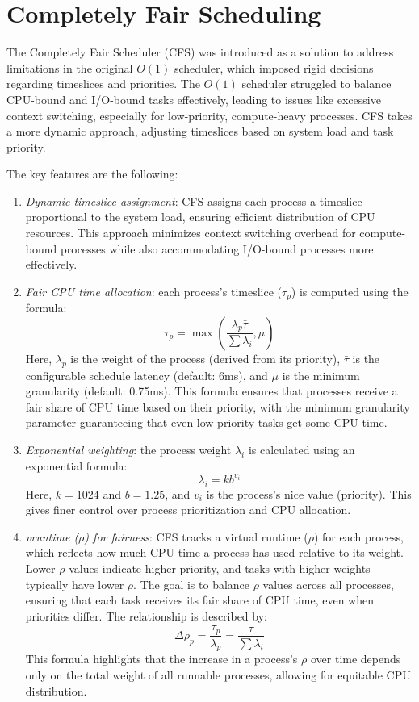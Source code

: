 \section{Completely Fair Scheduling}

The Completely Fair Scheduler (CFS) was introduced as a solution to address limitations in the original $O(1)$ scheduler, which imposed rigid decisions regarding timeslices and priorities. 
The $O(1)$ scheduler struggled to balance CPU-bound and I/O-bound tasks effectively, leading to issues like excessive context switching, especially for low-priority, compute-heavy processes.
CFS takes a more dynamic approach, adjusting timeslices based on system load and task priority.

The key features are the following: 
\begin{enumerate}
    \item \textit{Dynamic timeslice assignment}: CFS assigns each process a timeslice proportional to the system load, ensuring efficient distribution of CPU resources. 
        This approach minimizes context switching overhead for compute-bound processes while also accommodating I/O-bound processes more effectively.
    \item \textit{Fair CPU time allocation}: each process's timeslice ($\tau_p$) is computed using the formula:
        \[\tau_p=\max\left(\dfrac{\lambda_p\bar{\tau}}{\sum\lambda_i},\mu\right)\]
        Here, $\lambda_p$ is the weight of the process (derived from its priority), $\bar{\tau}$ is the configurable schedule latency (default: 6ms), and $\mu$ is the minimum granularity (default: 0.75ms). 
        This formula ensures that processes receive a fair share of CPU time based on their priority, with the minimum granularity parameter guaranteeing that even low-priority tasks get some CPU time.
    \item \textit{Exponential weighting}: the process weight $\lambda_i$ is calculated using an exponential formula:
        \[\lambda_i=kb^{v_i}\]
        Here, $k = 1024$ and $b = 1.25$, and $v_i$ is the process's nice value (priority).
        This gives finer control over process prioritization and CPU allocation.
    \item \textit{vruntime ($\rho$) for fairness}: CFS tracks a virtual runtime ($\rho$) for each process, which reflects how much CPU time a process has used relative to its weight. 
        Lower $\rho$ values indicate higher priority, and tasks with higher weights typically have lower $\rho$. 
        The goal is to balance $\rho$ values across all processes, ensuring that each task receives its fair share of CPU time, even when priorities differ. 
        The relationship is described by:
        \[\Delta\rho_p=\dfrac{\tau_p}{\lambda_p}=\dfrac{\bar{\tau}}{\sum\lambda_i}\]
        This formula highlights that the increase in a process's $\rho$ over time depends only on the total weight of all runnable processes, allowing for equitable CPU distribution.
\end{enumerate}
